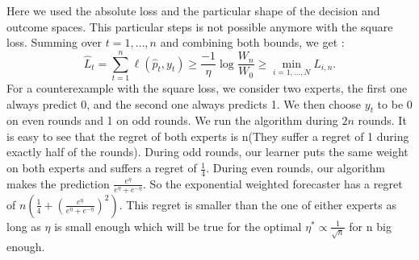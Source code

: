 \begin{solution}[]
\begin{equation*}
\end{equation*}
Here we used the absolute loss and the particular shape of the decision and outcome spaces. This particular steps is not possible anymore with the square loss.
Summing over $ t=1,\ldots,n $ and combining both bounds, we get :
\begin{equation*}
	\hat{L}_t = \sum_{t=1}^{n}\ell(\hat{p}_t,y_t) \geq \frac{-1}{\eta}\log \frac{W_n}{W_0} \geq \min_{i=1,\ldots,N} L_{i,n}.
\end{equation*}
For a counterexample with the square loss, we consider two experts, the first one always predict 0, and the second one always predicts 1. We then choose $ y_t $ to be 0 on even rounds and 1 on odd rounds. We run the algorithm during $ 2n $ rounds. It is easy to see that the regret of both experts is n(They suffer a regret of 1 during exactly half of the rounds). During odd rounds, our learner puts the same weight on both experts and suffers a regret of $ \frac{1}{4} $. During even rounds, our algorithm makes the prediction $ \frac{e^{\eta}}{e^{\eta} + e^{-\eta}} $. So the exponential weighted forecaster has a regret of $ n(\frac{1}{4} + (\frac{e^{\eta}}{e^{\eta} + e^{-\eta}})^2) $. This regret is smaller than the one of either experts as long as $ \eta $ is small enough which will be true for the optimal $ \eta^{*} \propto \frac{1}{\sqrt{n}} $ for n big enough.

\end{solution}
